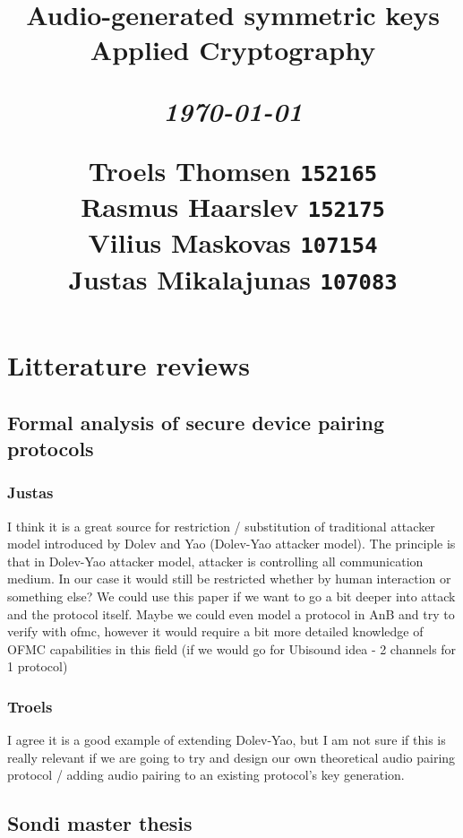 \documentclass[12pt]{article}
\title{
  \vspace{4cm}
  \begin{flushleft}
  \Large{\textbf{Audio-generated symmetric keys}} \\
  \large{Applied Cryptography}
  \end{flushleft}
  \vspace{0cm}
  \begin{flushleft}
  \small
  \textit{\today}
  \end{flushleft}
  \vspace{12cm}
  \begin{flushleft}
  \small
  Troels Thomsen \texttt{152165} \\
  Rasmus Haarslev \texttt{152175} \\
  Vilius Maskovas \texttt{107154} \\
  Justas Mikalajunas \texttt{107083}\\
  \end{flushleft}
}
\date{
}
\begin{document}
\clearpage
{}
\thispagestyle{empty}
\maketitle

\newpage


\section{Litterature reviews}

\subsection{Formal analysis of secure device pairing protocols}
\label{sub:Formal analysis of secure device pairing protocols}

\subsubsection{Justas}
\label{subs:Justas}

I think it is a great source for restriction / substitution of traditional attacker model introduced by Dolev and Yao (Dolev-Yao attacker model).
The principle is that in Dolev-Yao attacker model, attacker is controlling all communication medium. In our case it would still be restricted whether by human interaction or something else?
We could use this paper if we want to go a bit deeper into attack and the protocol itself. Maybe we could even model a protocol in AnB and  try to verify with ofmc, however it would require a bit more detailed knowledge of OFMC capabilities in this field (if we would go for Ubisound idea - 2 channels for 1 protocol)

\subsubsection{Troels}
\label{subs:Troels}

I agree it is a good example of extending Dolev-Yao, but I am not sure if this is really relevant if we are going to try and design our own theoretical audio pairing protocol / adding audio pairing to an existing protocol's key generation.

\subsection{Sondi master thesis}
\label{sub:Sondi master thesis}
\end{document}
